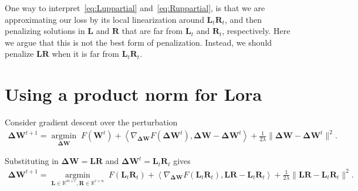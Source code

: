\documentclass[11pt]{article}
\newcommand{\mat}[1]{\bm{#1}}
\newcommand{\R}{\mathbb{R}}
\newcommand{\mL}{\mat{L}}
\newcommand{\mR}{\mat{R}}
\newcommand{\mW}{\mat{W}}
\newcommand{\DW}{\mat{\Delta W}}
\newcommand{\dotprod}[1]{\left< #1\right>}
\DeclareMathOperator{\argmininn}{argmin}
\newcommand{\argmin}[1]{ \underset{#1}{\argmininn} \;}
\begin{document}
   
One way to interpret~\eqref{eq:Luppartial} and~\eqref{eq:Ruppartial}, is that we are approximating our loss by its local linearization around $\mL_t\mR_t$, and then penalizing solutions in $\mL$ and $\mR$ that are far from $\mL_t$ and $\mR_t$, respectively. Here we argue that this is not the best form of penalization.  Instead, we should penalize $\mL\mR$ when it is far from $\mL_t\mR_t$.  

\section{Using a product norm for Lora}
Consider gradient descent over the perturbation 
\begin{align*}
 \DW^{t+1}=   \argmin{\DW} F(\mW^t) + \dotprod{\nabla_{\DW} F(\DW^t), \DW-\DW^t } + \frac{1}{2\lambda} \|\DW-\DW^t\|^2.
\end{align*}

Substituting in $\DW = \mL \mR$ and $\DW^t= \mL_t \mR_t$ gives
\begin{align}
 \DW^{t+1}=   \argmin{\mL\in \R^{m \times r},\mR \in \R^{r \times n}} F(\mL_t\mR_t) + \dotprod{\nabla_{\DW} F(\mL_t\mR_t), \mL\mR-\mL_t\mR_t } + \frac{1}{2\lambda} \|\mL\mR-\mL_t\mR_t\|^2. \label{eq:fullprodGD}
\end{align}
\end{document}
